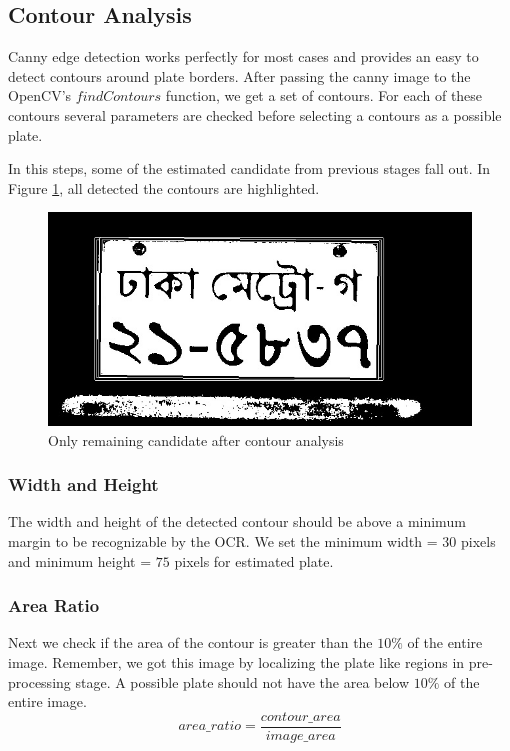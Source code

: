 \documentclass{standalone}
\begin{document}
\subsection{Contour Analysis}
Canny edge detection works perfectly for most cases and provides an easy to detect contours around plate borders. After passing the canny image to the OpenCV's $findContours$ function, we get a set of contours. For each of these contours several parameters are checked before selecting a contours as a possible plate.

In this steps, some of the estimated candidate from previous stages fall out. In Figure \ref{fig:ContourImage}, all detected the contours are highlighted.
\begin{figure}
    \centering
    \includegraphics[width=.7\linewidth]{./img/sample/stage9.jpg}
    \caption{Only remaining candidate after contour analysis}
    \label{fig:ContourImage}
\end{figure}



\subsubsection{Width and Height}
The width and height of the detected contour should be above a minimum margin to be recognizable by the OCR. We set the minimum width = $30$ pixels and minimum height = $75$ pixels for estimated plate.

\subsubsection{Area Ratio}
Next we check if the area of the contour is greater than the $10\%$ of the entire image. Remember, we got this image by localizing the plate like regions in pre-processing stage. A possible plate should not have the area below $10\%$ of the entire image.
\begin{equation}
area\_ratio = \dfrac{contour\_area}{image\_area }
\end{equation}
\end{document}
